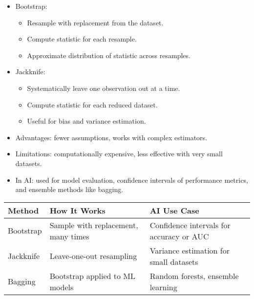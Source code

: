 \documentclass[
  letterpaper,
  DIV=11,
  numbers=noendperiod]{scrreprt}
\providecommand{\tightlist}{%
  \setlength{\itemsep}{0pt}\setlength{\parskip}{0pt}}
\begin{document}
\begin{itemize}
\item
  Bootstrap:

  \begin{itemize}
  \tightlist
  \item
    Resample with replacement from the dataset.
  \item
    Compute statistic for each resample.
  \item
    Approximate distribution of statistic across resamples.
  \end{itemize}
\item
  Jackknife:

  \begin{itemize}
  \tightlist
  \item
    Systematically leave one observation out at a time.
  \item
    Compute statistic for each reduced dataset.
  \item
    Useful for bias and variance estimation.
  \end{itemize}
\item
  Advantages: fewer assumptions, works with complex estimators.
\item
  Limitations: computationally expensive, less effective with very small
  datasets.
\item
  In AI: used for model evaluation, confidence intervals of performance
  metrics, and ensemble methods like bagging.
\end{itemize}

\begin{longtable}[]{@{}
  >{\raggedright\arraybackslash}p{}
  >{\raggedright\arraybackslash}p{}
  >{\raggedright\arraybackslash}p{}@{}}
\toprule\noalign{}
\begin{minipage}[b]{\linewidth}\raggedright
Method
\end{minipage} & \begin{minipage}[b]{\linewidth}\raggedright
How It Works
\end{minipage} & \begin{minipage}[b]{\linewidth}\raggedright
AI Use Case
\end{minipage} \\
\midrule\noalign{}
\endhead
\bottomrule\noalign{}
\endlastfoot
Bootstrap & Sample with replacement, many times & Confidence intervals
for accuracy or AUC \\
Jackknife & Leave-one-out resampling & Variance estimation for small
datasets \\
Bagging & Bootstrap applied to ML models & Random forests, ensemble
learning \\
\end{longtable}
\end{document}
